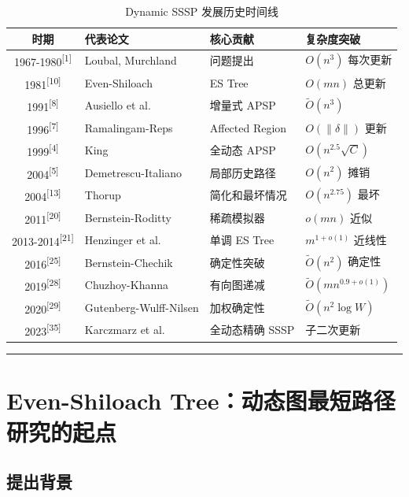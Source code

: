 \documentclass[12pt,a4paper]{ctexart}
\let\oldsection\section
\renewcommand{\section}{\clearpage\oldsection}
\begin{document}
\begin{table}[H]
\centering
\caption{Dynamic SSSP 发展历史时间线}
\label{tab:history}
\small
\begin{tabular}{|c|p{2.8cm}|p{3.0cm}|p{4.5cm}|}
\toprule
\textbf{时期} & \textbf{代表论文} & \textbf{核心贡献} & \textbf{复杂度突破} \\
\midrule
1967-1980\textsuperscript{[1]} & Loubal, Murchland & 问题提出 & $O(n^3)$ 每次更新 \\
1981\textsuperscript{[10]} & Even-Shiloach & ES Tree & $O(mn)$ 总更新 \\
1991\textsuperscript{[8]} & Ausiello et al. & 增量式 APSP & $\tilde{O}(n^3)$ \\
1996\textsuperscript{[7]} & Ramalingam-Reps & Affected Region & $O(\|\delta\|)$ 更新 \\
1999\textsuperscript{[4]} & King & 全动态 APSP & $O(n^{2.5}\sqrt{C})$ \\
2004\textsuperscript{[5]} & Demetrescu-Italiano & 局部历史路径 & $O(n^2)$ 摊销 \\
2004\textsuperscript{[13]} & Thorup & 简化和最坏情况 & $O(n^{2.75})$ 最坏 \\
2011\textsuperscript{[20]} & Bernstein-Roditty & 稀疏模拟器 & $o(mn)$ 近似 \\
2013-2014\textsuperscript{[21]} & Henzinger et al. & 单调 ES Tree & $m^{1+o(1)}$ 近线性 \\
2016\textsuperscript{[25]} & Bernstein-Chechik & 确定性突破 & $\tilde{O}(n^2)$ 确定性 \\
2019\textsuperscript{[28]} & Chuzhoy-Khanna & 有向图递减 & $\tilde{O}(mn^{0.9+o(1)})$ \\
2020\textsuperscript{[29]} & Gutenberg-Wulff-Nilsen & 加权确定性 & $\tilde{O}(n^2\log W)$ \\
2023\textsuperscript{[35]} & Karczmarz et al. & 全动态精确 SSSP & 子二次更新 \\
\bottomrule
\end{tabular}
\end{table}


\noindent\rule{\textwidth}{0.4pt}
\section{Even-Shiloach Tree：动态图最短路径研究的起点}

\subsection{提出背景}
\end{document}
